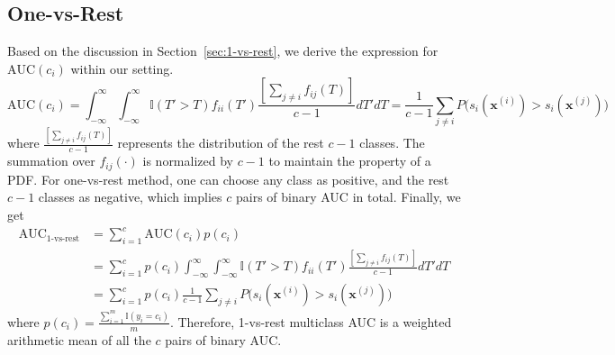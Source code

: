 \documentclass[twoside,11pt]{article}
\renewcommand{\>}{{\rightarrow}}
\newcommand{\1}{{\mathbf 1}}
\newcommand{\0}{{\mathbf 0}}
\begin{document}
\subsection{One-vs-Rest}
Based on the discussion in Section~\ref{sec:1-vs-rest}, we derive the expression for $\text{AUC}(c_i)$ within our setting.
\begin{equation}
    \text{AUC}(c_i) = \int_{−\infty}^{\infty}\int_{−\infty}^{\infty}\mathbb{I}(T'>T)f_{ii}(T')\frac{[\sum\limits_{j\neq i}f_{ij}(T)]}{c-1}dT'dT = \frac{1}{c-1} \sum\limits_{j \neq i} P\big(s_i(\mathbf{x}^{(i)}) > s_i(\mathbf{x}^{(j)})\big)
\end{equation}
where $\frac{[\sum\limits_{j\neq i}f_{ij}(T)]}{c-1}$ represents the distribution of the rest $c-1$ classes. The summation over $f_{ij}(\cdot)$ is normalized by $c-1$ to maintain the property of a PDF.
For one-vs-rest method, one can choose any class as positive, and the rest $c-1$ classes as negative, which implies $c$ pairs of binary AUC in total. Finally, we get
\begin{align}
    \text{AUC}_{\text{1-vs-rest}} &= \sum\limits_{i=1}^c \text{AUC}(c_i) p(c_i) \\
    &= \sum\limits_{i=1}^c p(c_i) \int_{−\infty}^{\infty}\int_{−\infty}^{\infty}\mathbb{I}(T'>T)f_{ii}(T')\frac{[\sum\limits_{j\neq i}f_{ij}(T)]}{c-1}dT'dT \\
    &= \sum\limits_{i=1}^c p(c_i) \frac{1}{c-1} \sum\limits_{j \neq i} P\big(s_i(\mathbf{x}^{(i)}) > s_i(\mathbf{x}^{(j)})\big)
\end{align}
where $p(c_i) = \frac{\sum\limits_{i=1}^m\mathbb{I}(y_i=c_i)}{m}$. Therefore, 1-vs-rest multiclass AUC is a weighted arithmetic mean of all the $c$ pairs of binary AUC.
\end{document}
